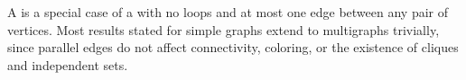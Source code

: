 \begin{remark} \label{remark:simple_graph_is_a_special_case_of_multigraph}
A  is a special case of a  with no loops and at most one edge between any pair of vertices. Most results stated for simple graphs extend to multigraphs trivially, since parallel edges do not affect connectivity, coloring, or the existence of cliques and independent sets.
\end{remark}
